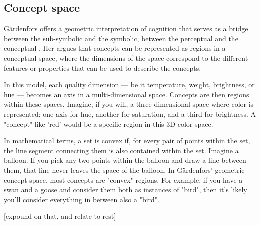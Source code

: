 \subsection{Concept space} \label{subsec:gaerdenfors}

Gärdenfors offers a geometric interpretation of cognition that serves as a bridge between the sub-symbolic and the symbolic, between the perceptual and the conceptual \cite{Gaerdenfors}. Her argues that concepts can be represented as regions in a conceptual space, where the dimensions of the space correspond to the different features or properties that can be used to describe the concepts.

In this model, each quality dimension — be it temperature, weight, brightness, or hue — becomes an axis in a multi-dimensional space. Concepts are then regions within these spaces. Imagine, if you will, a three-dimensional space where color is represented: one axis for hue, another for saturation, and a third for brightness. A "concept" like 'red' would be a specific region in this 3D color space.


In mathematical terms, a set is convex if, for every pair of points within the set, the line segment connecting them is also contained within the set. Imagine a balloon. If you pick any two points within the balloon and draw a line between them, that line never leaves the space of the balloon. In Gärdenfors' geometric concept space, most concepts are "convex" regions. For example, if you have a swan and a goose and consider them both as instances of "bird", then it's likely you'll consider everything in between also a "bird".


[expound on that, and relate to rest]




